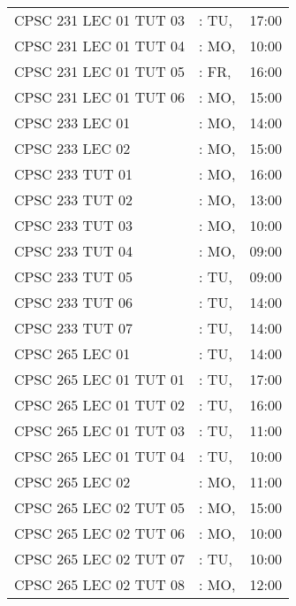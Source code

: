 \documentclass[11pt]{article}
\begin{document}
\begin{longtable}{l l r}
CPSC 231 LEC 01 TUT 03        &\hspace*{1.5cm}: TU,& 17:00\tabularnewline
CPSC 231 LEC 01 TUT 04        &\hspace*{1.5cm}: MO,& 10:00\tabularnewline
CPSC 231 LEC 01 TUT 05        &\hspace*{1.5cm}: FR,& 16:00\tabularnewline
CPSC 231 LEC 01 TUT 06        &\hspace*{1.5cm}: MO,& 15:00\tabularnewline
CPSC 233 LEC 01               &\hspace*{1.5cm}: MO,& 14:00\tabularnewline
CPSC 233 LEC 02               &\hspace*{1.5cm}: MO,& 15:00\tabularnewline
CPSC 233 TUT 01               &\hspace*{1.5cm}: MO,& 16:00\tabularnewline
CPSC 233 TUT 02               &\hspace*{1.5cm}: MO,& 13:00\tabularnewline
CPSC 233 TUT 03               &\hspace*{1.5cm}: MO,& 10:00\tabularnewline
CPSC 233 TUT 04               &\hspace*{1.5cm}: MO,& 09:00\tabularnewline
CPSC 233 TUT 05               &\hspace*{1.5cm}: TU,& 09:00\tabularnewline
CPSC 233 TUT 06               &\hspace*{1.5cm}: TU,& 14:00\tabularnewline
CPSC 233 TUT 07               &\hspace*{1.5cm}: TU,& 14:00\tabularnewline
CPSC 265 LEC 01               &\hspace*{1.5cm}: TU,& 14:00\tabularnewline
CPSC 265 LEC 01 TUT 01        &\hspace*{1.5cm}: TU,& 17:00\tabularnewline
CPSC 265 LEC 01 TUT 02        &\hspace*{1.5cm}: TU,& 16:00\tabularnewline
CPSC 265 LEC 01 TUT 03        &\hspace*{1.5cm}: TU,& 11:00\tabularnewline
CPSC 265 LEC 01 TUT 04        &\hspace*{1.5cm}: TU,& 10:00\tabularnewline
CPSC 265 LEC 02               &\hspace*{1.5cm}: MO,& 11:00\tabularnewline
CPSC 265 LEC 02 TUT 05        &\hspace*{1.5cm}: MO,& 15:00\tabularnewline
CPSC 265 LEC 02 TUT 06        &\hspace*{1.5cm}: MO,& 10:00\tabularnewline
CPSC 265 LEC 02 TUT 07        &\hspace*{1.5cm}: TU,& 10:00\tabularnewline
CPSC 265 LEC 02 TUT 08        &\hspace*{1.5cm}: MO,& 12:00\tabularnewline

\end{longtable}
\end{document}
